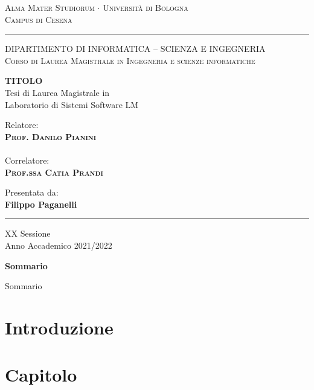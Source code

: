 \documentclass[12pt,a4paper]{report}
\begin{document}
\lstset{language=C, numbers = left}
\begin{titlepage}
\begin{center}
{{\Large{\textsc{Alma Mater Studiorum $\cdot$ Universit\`a di
Bologna\\\vspace{2mm}Campus di Cesena}}}} \rule[0.1cm]{15.8cm}{0.2mm}

{\small{\textsc { DIPARTIMENTO DI INFORMATICA – SCIENZA E INGEGNERIA \\
\vspace{3mm}
Corso di Laurea Magistrale in Ingegneria e scienze informatiche}}}
\end{center}
\vspace{15mm}
\begin{center}
{\LARGE\textbf{TITOLO}}\\
\vspace{20mm} {\large{\sc Tesi di Laurea Magistrale in\\ Laboratorio di Sistemi Software LM}}
\end{center}
\vfill
\par
\noindent

\begin{minipage}[t]{0.47\textwidth}
{\large{\sc Relatore:}\\
{\bf \textsc{Prof. Danilo Pianini}}}\\ \\
{\large{\sc Correlatore:}\\
{\bf \textsc{Prof.ssa Catia Prandi}}}\\
\vskip 8pt
\end{minipage}
\hfill
\begin{minipage}[t]{0.47\textwidth}\raggedleft
{\large{\sc Presentata da:}\\
{\bf Filippo Paganelli}}
\end{minipage}
\vspace{20mm}
\begin{center}
\rule[0.1cm]{15.8cm}{0.2mm}
{\large{\sc XX Sessione\\
Anno Accademico 2021/2022}}
\end{center}
\end{titlepage}

\newpage

\begin{center}
{\LARGE{\bf Sommario}}
\end{center}
{
\noindent
Sommario
}

\newpage

\tableofcontents

\chapter{Introduzione}
\label{ch:introduzione}


\chapter{Capitolo}
\label{ch:capitolo}

\end{document}
